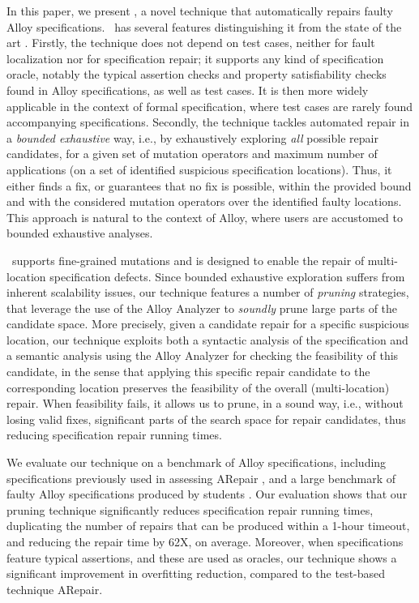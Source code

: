 In this paper, we present \technique, a novel technique that automatically repairs faulty Alloy specifications. \technique\ has several features distinguishing it from the state of the art \cite{Wang+2018}. Firstly, the technique does not depend on test cases, neither for fault localization nor for specification repair; it supports any kind of specification oracle, notably the typical assertion checks and property satisfiability checks found in Alloy specifications, as well as test cases. It is then more widely applicable in the context of formal specification, where test cases are rarely found accompanying specifications. Secondly, the technique tackles automated repair in a \emph{bounded exhaustive} way, i.e., by exhaustively exploring \emph{all} possible repair candidates, for a given set of mutation operators and maximum number of applications (on a set of identified suspicious specification locations). Thus, it either finds a fix, or guarantees that no fix is possible, within the provided bound and with the considered mutation operators over the identified faulty locations. This approach is natural to the context of Alloy, where users are accustomed to bounded exhaustive analyses.

\technique\ supports fine-grained mutations and is designed to enable the repair of multi-location specification defects. Since bounded exhaustive exploration suffers from inherent scalability issues, our technique features a number of \emph{pruning} strategies, that leverage the use of the Alloy Analyzer to \emph{soundly} prune large parts of the candidate space. More precisely, given a candidate repair for a specific suspicious location, our technique exploits both a syntactic analysis of the specification and a semantic analysis using the Alloy Analyzer for checking the feasibility of this candidate, in the sense that applying this specific repair candidate to the corresponding location preserves the feasibility of the overall (multi-location) repair. When feasibility fails, it allows us to prune, in a sound way, i.e., without losing valid fixes, significant parts of the search space for repair candidates, thus reducing specification repair running times. 

We evaluate our technique on a benchmark of Alloy specifications, including specifications previously used in assessing ARepair \cite{Wang+2018,Wang+2019}, and a large benchmark of faulty Alloy specifications produced by students \cite{Macedo+2020}. Our evaluation shows that our pruning technique significantly reduces specification repair running times, duplicating the number of repairs that can be produced within a 1-hour timeout, and reducing the repair time by 62X, on average. Moreover, when specifications feature typical assertions, and these are used as oracles, our technique shows a significant improvement in overfitting reduction, compared to the test-based technique ARepair.

